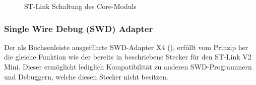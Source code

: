 \begin{figure}[H]
    \centering
    \qquad
{}\qquad
    \caption[ST-Link Schaltung des Core-Moduls]{ST-Link Schaltung des \gls{Core-Modul}s}
    \label{fig:coremodul-swd}
\end{figure}


\subsubsection{Single Wire Debug (SWD) Adapter}
Der als Buchsenleiste ausgeführte SWD-Adapter X4 (), erfüllt vom Prinzip her die gleiche Funktion wie der bereits in  beschriebene Stecker für den ST-Link V2 Mini. Dieser ermöglicht lediglich Kompatibilität zu anderen SWD-Programmern und Debuggern, welche diesen Stecker nicht besitzen.

